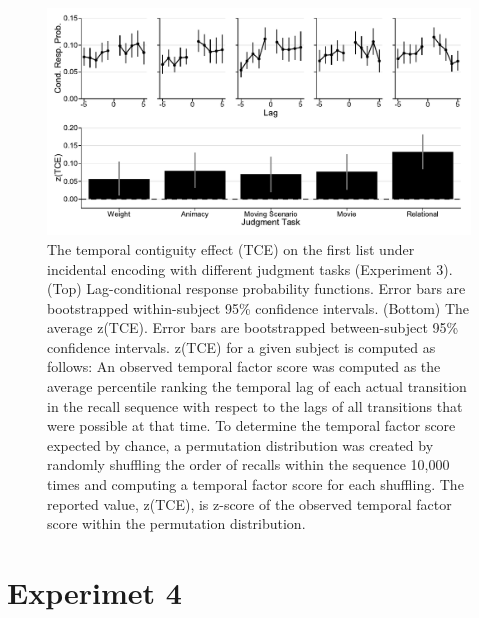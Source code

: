 \documentclass[man,natbib,floatsintext]{apa6} %
\begin{document}
  


\color{black}

\begin{figure}%
\includegraphics{figures/E3_crp_list1.pdf}
\caption{The temporal contiguity effect (TCE) on the first list under incidental encoding with different judgment tasks (Experiment 3). (Top) Lag-conditional response probability functions. Error bars are bootstrapped within-subject 95\% confidence intervals. (Bottom) The average z(TCE).  Error bars are bootstrapped between-subject 95\% confidence intervals. z(TCE) for a given subject is computed as follows: An observed temporal factor score was computed as the average percentile ranking the temporal lag of each actual transition in the recall sequence with respect to the lags of all transitions that were possible at that time. To determine the temporal factor score expected by chance, a permutation distribution was created by randomly shuffling the order of recalls within the sequence 10,000 times and computing a temporal factor score for each shuffling. The reported value, z(TCE), is z-score of the observed temporal factor score within the permutation distribution.}
\label{e3_l1_crp}
\end{figure}


\color{red}
\section{Experimet 4}
\label{newexp}




\end{document}
